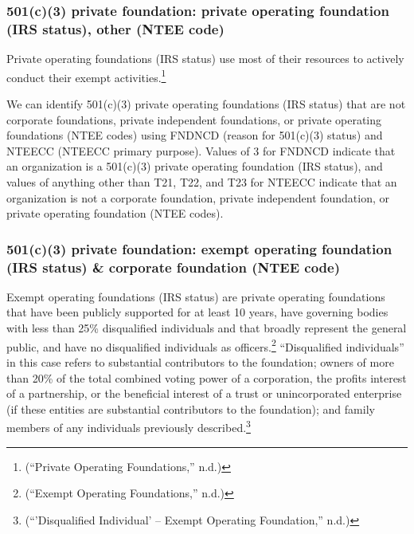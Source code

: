 \documentclass[
  letterpaper,
  DIV=11,
  numbers=noendperiod]{scrreprt}
\begin{document}
\hypertarget{c3-private-foundation-private-operating-foundation-irs-status-other-ntee-code}{%
\subsubsection{501(c)(3) private foundation: private operating
foundation (IRS status), other (NTEE
code)}\label{c3-private-foundation-private-operating-foundation-irs-status-other-ntee-code}}

Private operating foundations (IRS status) use most of their resources
to actively conduct their exempt activities.\footnote{({``Private
  Operating Foundations,''} n.d.)}

We can identify 501(c)(3) private operating foundations (IRS status)
that are not corporate foundations, private independent foundations, or
private operating foundations (NTEE codes) using FNDNCD (reason for
501(c)(3) status) and NTEECC (NTEECC primary purpose). Values of 3 for
FNDNCD indicate that an organization is a 501(c)(3) private operating
foundation (IRS status), and values of anything other than T21, T22, and
T23 for NTEECC indicate that an organization is not a corporate
foundation, private independent foundation, or private operating
foundation (NTEE codes).

\hypertarget{c3-private-foundation-exempt-operating-foundation-irs-status-corporate-foundation-ntee-code}{%
\subsubsection{501(c)(3) private foundation: exempt operating foundation
(IRS status) \& corporate foundation (NTEE
code)}\label{c3-private-foundation-exempt-operating-foundation-irs-status-corporate-foundation-ntee-code}}

Exempt operating foundations (IRS status) are private operating
foundations that have been publicly supported for at least 10 years,
have governing bodies with less than 25\% disqualified individuals and
that broadly represent the general public, and have no disqualified
individuals as officers.\footnote{({``Exempt Operating Foundations,''}
  n.d.)} ``Disqualified individuals'' in this case refers to substantial
contributors to the foundation; owners of more than 20\% of the total
combined voting power of a corporation, the profits interest of a
partnership, or the beneficial interest of a trust or unincorporated
enterprise (if these entities are substantial contributors to the
foundation); and family members of any individuals previously
described.\footnote{({``'Disqualified Individual' -- Exempt Operating
  Foundation,''} n.d.)}
\end{document}

